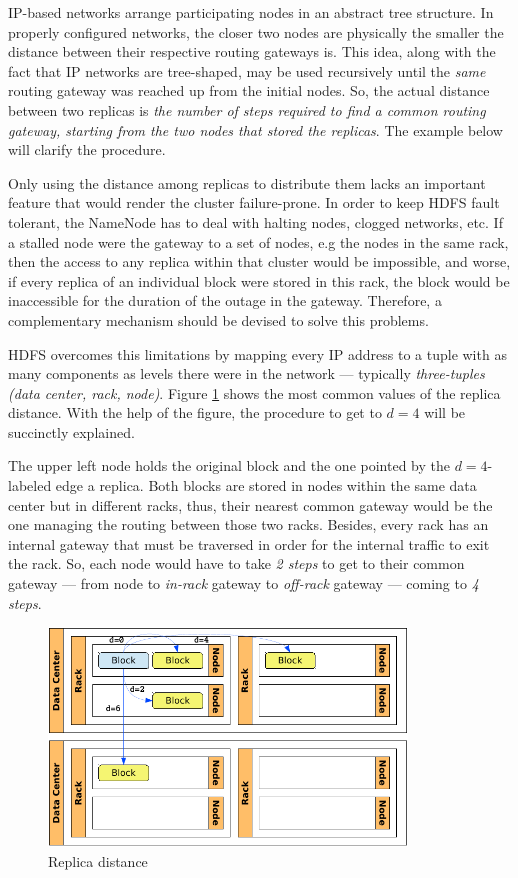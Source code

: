 IP-based networks arrange participating nodes in an abstract tree structure. In properly configured networks, the closer two nodes are physically the smaller the distance between their respective routing gateways is. This idea, along with the fact that IP networks are tree-shaped, may be used recursively until the \emph{same} routing gateway was reached up from the initial nodes. So, the actual distance between two replicas is \emph{the number of steps required to find a common routing gateway, starting from the two nodes that stored the replicas}. The example below will clarify the procedure.

Only using the distance among replicas to distribute them lacks an important feature that would render the cluster failure-prone. In order to keep HDFS fault tolerant, the NameNode has to deal with halting nodes, clogged networks, etc. If a stalled node were the gateway to a set of nodes, e.g the nodes in the same rack, then the access to any replica within that cluster would be impossible, and worse, if every replica of an individual block were stored in this rack, the block would be inaccessible for the duration of the outage in the gateway. Therefore, a complementary mechanism should be devised to solve this problems.

HDFS overcomes this limitations by mapping every IP address to a tuple with as many components as levels there were in the network --- typically \emph{three-tuples} \emph{(data center, rack, node)}. Figure \ref{fig:distnodos} shows the most common values of the replica distance. With the help of the figure, the procedure to get to $d=4$ will be succinctly explained.

The upper left node holds the original block and the one pointed by the $d=4$-labeled edge a replica. Both blocks are stored in nodes within the same data center but in different racks, thus, their nearest common gateway would be the one managing the routing between those two racks. Besides, every rack has an internal gateway that must be traversed in order for the internal traffic to exit the rack. So, each node would have to take \emph{2 steps} to get to their common gateway --- from node to \emph{in-rack} gateway to \emph{off-rack} gateway --- coming to \emph{4 steps}.

\begin{figure}[tbp]
\begin{center}
\includegraphics[width=0.85\textwidth]{imagenes/018.pdf}
 \caption{Replica distance}
\label{fig:distnodos}
\end{center}
\end{figure}

